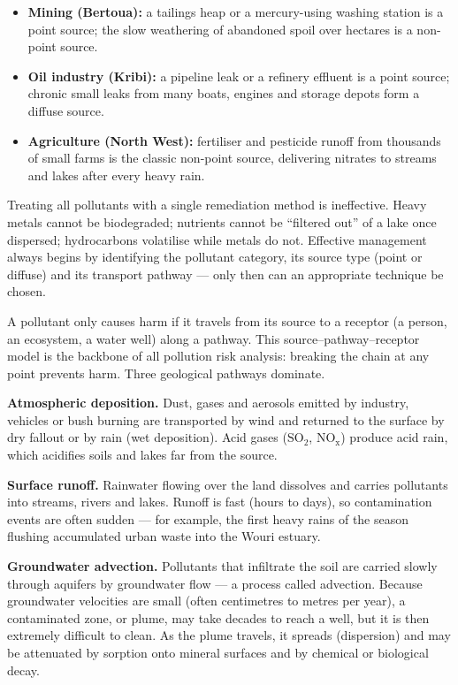 \documentclass[11pt]{article}
\newcommand{\cle}[1]{{\popxbold\color{popdark}#1}}
\newcounter{popsec}
\newcounter{popsub}
\newcommand{\courssub}[1]{%
  \stepcounter{popsub}%
  \par\vspace{9pt}\noindent{\popxbold\fontsize{11.5}{13}\selectfont\color{popink}{\color{poporange}\thepopsec.\thepopsub}\hspace{6pt}#1}\par\nopagebreak\vspace{4pt}
}
\begin{document}
\begin{itemize}
\item \textbf{Mining (Bertoua):} a tailings heap or a mercury-using washing station is a point source; the slow weathering of abandoned spoil over hectares is a non-point source.
\item \textbf{Oil industry (Kribi):} a pipeline leak or a refinery effluent is a point source; chronic small leaks from many boats, engines and storage depots form a diffuse source.
\item \textbf{Agriculture (North West):} fertiliser and pesticide runoff from thousands of small farms is the classic non-point source, delivering nitrates to streams and lakes after every heavy rain.
\end{itemize}

\begin{attention}
Treating all pollutants with a single remediation method is ineffective. Heavy metals cannot be biodegraded; nutrients cannot be ``filtered out'' of a lake once dispersed; hydrocarbons volatilise while metals do not. Effective management always begins by identifying the pollutant category, its source type (point or diffuse) and its transport pathway — only then can an appropriate technique be chosen.
\end{attention}

\courssub{Transport Pathways of Pollutants}

A pollutant only causes harm if it travels from its \cle{source} to a \cle{receptor} (a person, an ecosystem, a water well) along a \cle{pathway}. This \cle{source–pathway–receptor} model is the backbone of all pollution risk analysis: breaking the chain at any point prevents harm. Three geological pathways dominate.

\textbf{Atmospheric deposition.} Dust, gases and aerosols emitted by industry, vehicles or bush burning are transported by wind and returned to the surface by dry fallout or by rain (wet deposition). Acid gases ($\mathrm{SO_2}$, $\mathrm{NO_x}$) produce acid rain, which acidifies soils and lakes far from the source.

\textbf{Surface runoff.} Rainwater flowing over the land dissolves and carries pollutants into streams, rivers and lakes. Runoff is fast (hours to days), so contamination events are often sudden — for example, the first heavy rains of the season flushing accumulated urban waste into the Wouri estuary.

\textbf{Groundwater advection.} Pollutants that infiltrate the soil are carried slowly through aquifers by groundwater flow — a process called \cle{advection}. Because groundwater velocities are small (often centimetres to metres per year), a contaminated zone, or \cle{plume}, may take decades to reach a well, but it is then extremely difficult to clean. As the plume travels, it spreads (\cle{dispersion}) and may be attenuated by sorption onto mineral surfaces and by chemical or biological decay.
\end{document}
